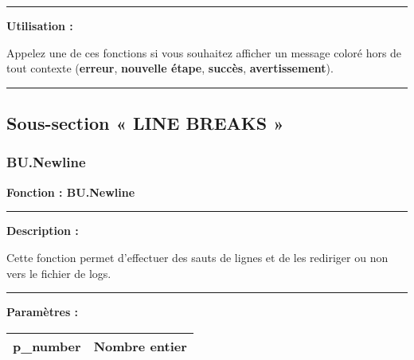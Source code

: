 \documentclass[a4paper,10pt]{article}
\begin{document}

\par\noindent\rule{\textwidth}{0.4pt}

\begin{justify}
    \textbf{Utilisation :}

    Appelez une de ces fonctions si vous souhaitez afficher un message coloré hors de tout contexte (\textbf{\color{Red}erreur}, \textbf{\color{Orange}nouvelle étape}, \textbf{\color{Green}succès}, \textbf{\color{Yellow}avertissement}).
\end{justify}




\color{sec2}\par\noindent\rule{\textwidth}{0.4pt}\color{text}\setlength{\parskip}{1em}

\color{sec2}
\subsection{Sous-section « LINE BREAKS »}\color{text}

\color{sec3}
\subsubsection{BU.Newline}\color{text}

\begin{justify}
    \textbf{Fonction : \textbf{\color{func}BU.Newline}}
\end{justify}


\par\noindent\rule{\textwidth}{0.4pt}

\begin{justify}
    \textbf{Description :}

    Cette fonction permet d'effectuer des sauts de lignes et de les rediriger ou non vers le fichier de logs.
\end{justify}


\par\noindent\rule{\textwidth}{0.4pt}

\begin{justify}
    \textbf{Paramètres :}

    \begin{tabular}{|l|l|}
        \hline
        \textbf{\color{vars}p\_number} & Nombre entier\\
        \hline
    \end{tabular}
\end{justify}
\end{document}
